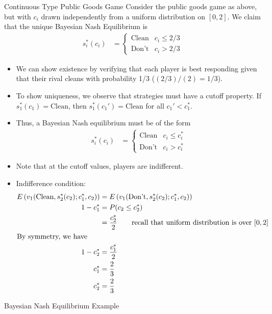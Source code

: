 \documentclass[10pt]{extarticle}
\begin{document}
  \begin{problem}{Continuous Type Public Goods Game}
    Consider the public goods game as above, but with $c_i$ drawn independently from a uniform distribution on $[0,2]$. We claim that the unique Bayesian Nash Equilibrium is
    \begin{align*}
      s_i^{\ast}(c_i) &= \begin{cases}
        \text{Clean} & c_i \leq 2/3\\
        \text{Don't} & c_i > 2/3
      \end{cases}
    \end{align*}
    \begin{itemize}
      \item We can show existence by verifying that each player is best responding given that their rival cleans with probability 1/3 ($(2/3)/(2) = 1/3$).
      \item To show uniqueness, we observe that strategies must have a cutoff property. If $s_1^{\ast}(c_1) = \text{Clean}$, then $s_1^{\ast}(c_1') = \text{Clean}$ for all $c_1' < c_1^{\ast}$.
      \item Thus, a Bayesian Nash equilibrium must be of the form
        \begin{align*}
          s_i^{\ast}(c_i) &= \begin{cases}
            \text{Clean} & c_i \leq c_i^{\ast}\\
            \text{Don't} & c_i > c_i^{\ast}
          \end{cases}
        \end{align*}
      \item Note that at the cutoff values, players are indifferent.
      \item Indifference condition:
        \begin{align*}
          E\left(v_1(\text{Clean},s_2^{\ast}(c_2);c_1^{\ast},c_2)\right) &= E\left(v_1(\text{Don't},s_2^{\ast}(c_2);c_1^{\ast},c_2)\right)\\
          1-c_1^{\ast} &= P(c_2\leq c_{2}^{\ast})\\
                       &= \frac{c_2^{\ast}}{2} \tag*{recall that uniform distribution is over $[0,2]$}\\
                       \shortintertext{By symmetry, we have}
          1-c_2^{\ast} &= \frac{c_1^{\ast}}{2}\\
          c_1^{\ast} &= \frac{2}{3}\\
          c_2^{\ast} &= \frac{2}{3}
        \end{align*}
    \end{itemize}
  \end{problem}
  \begin{problem}{Bayesian Nash Equilibrium Example}
    \begin{tcbraster}[raster columns = 1, sharp corners, colframe = black!75!white,colback=white]
    \end{tcbraster}
  \end{problem}
\end{document}
